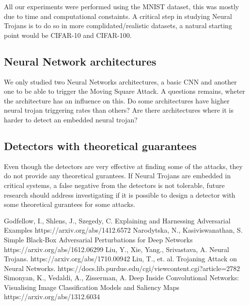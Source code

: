 \documentclass[letterpaper, 10 pt, conference]{ieeeconf}  %
\begin{document}
All our experiments were performed using the MNIST dataset, this was mostly due
to time and computational constaints. A critical step in studying Neural
Trojans is to do so in more complidated/realistic datasets, a natural starting
point would be CIFAR-10 and CIFAR-100.

\subsection{Neural Network architectures}

We only studied two Neural Networks architectures, a basic CNN and another one
to be able to trigger the Moving Square Attack. A questions remains, wheter
the architecture has an influence on this. Do some architectures have higher
neural trojan triggering rates than others? Are there architectures where it
is harder to detect an embedded neural trojan?


\subsection{Detectors with theoretical guarantees}

Even though the detectors are very effective at finding some of the attacks,
they do not provide any theoretical gurantees. If Neural Trojans are embedded
in critical systems, a false negative from the detectors is not tolerable,
future research should address investigating if it is possible to design a
detector with some theoretical gurantees for some attacks.


\begin{thebibliography}{99}

 Godfellow, I., Shlens, J., Szegedy, C. Explaining and Harnessing Adversarial Examples https://arxiv.org/abs/1412.6572
 Narodytska, N., Kasiviswanathan, S. Simple Black-Box Adversarial Perturbations for Deep Networks https://arxiv.org/abs/1612.06299
 Liu, Y., Xie, Yang., Srivastava, A. Neural Trojans. https://arxiv.org/abs/1710.00942
 Liu, T., et. al. Trojaning Attack on Neural Networks. https://docs.lib.purdue.edu/cgi/viewcontent.cgi?article=2782 
 Simonyan, K., Vedaldi, A., Zisserman, A. Deep Inside Convolutional Networks: Visualising Image Classification Models and Saliency Maps https://arxiv.org/abs/1312.6034






\end{thebibliography}
\end{document}
